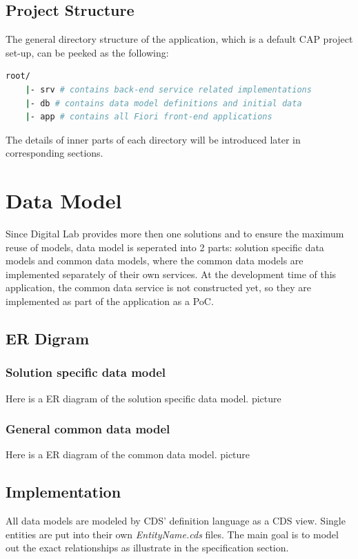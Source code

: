 \subsection{Project Structure}

The general directory structure of the application, which is a default CAP project set-up, can be peeked as the following:

\begin{lstlisting}[language={bash}]
root/
    |- srv # contains back-end service related implementations
    |- db # contains data model definitions and initial data
    |- app # contains all Fiori front-end applications
\end{lstlisting}

The details of inner parts of each directory will be introduced later in corresponding sections.

\section{Data Model}
Since Digital Lab provides more then one solutions and to ensure the maximum reuse of models, data model is seperated into 2 parts: solution specific data models and common data models, where the common data models are implemented separately of their own services. At the development time of this application, the common data service is not constructed yet, so they are implemented as part of the application as a PoC.

\subsection{ER Digram}
\subsubsection{Solution specific data model}

Here is a ER diagram of the solution specific data model.
picture
\subsubsection{General common data model}

Here is a ER diagram of the common data model.
picture

\subsection{Implementation}
All data models are modeled by CDS' definition language as a CDS view. Single entities are put into their own \textit{EntityName.cds} files. The main goal is to model out the exact relationships as illustrate in the specification section.

